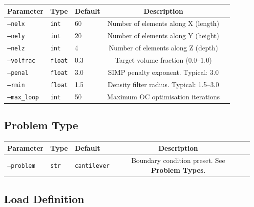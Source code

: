 \documentclass[11pt,a4paper]{article}
\begin{document}
\begin{table}[h]
\centering
\begin{tabularx}{\textwidth}{lllcX}
\toprule
\textbf{Parameter} & \textbf{Type} & \textbf{Default} & \textbf{Description} \\
\midrule
\texttt{--nelx} & \texttt{int} & 60 & Number of elements along X (length) \\
\texttt{--nely} & \texttt{int} & 20 & Number of elements along Y (height) \\
\texttt{--nelz} & \texttt{int} & 4 & Number of elements along Z (depth) \\
\texttt{--volfrac} & \texttt{float} & 0.3 & Target volume fraction (0.0–1.0) \\
\texttt{--penal} & \texttt{float} & 3.0 & SIMP penalty exponent. Typical: 3.0 \\
\texttt{--rmin} & \texttt{float} & 1.5 & Density filter radius. Typical: 1.5–3.0 \\
\texttt{--max\_loop} & \texttt{int} & 50 & Maximum OC optimisation iterations \\
\bottomrule
\end{tabularx}
\end{table}

\subsection{Problem Type}

\begin{table}[h]
\centering
\begin{tabularx}{\textwidth}{lllcX}
\toprule
\textbf{Parameter} & \textbf{Type} & \textbf{Default} & \textbf{Description} \\
\midrule
\texttt{--problem} & \texttt{str} & \texttt{cantilever} & Boundary condition preset. See \textbf{Problem Types}. \\
\bottomrule
\end{tabularx}
\end{table}

\subsection{Load Definition}
\end{document}
